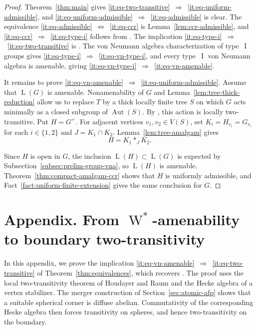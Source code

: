 \documentclass[11pt]{amsart}
\numberwithin{equation}{section}
\DeclareMathOperator{\LL}{L}
\DeclareMathOperator{\I}{I}
\DeclareMathOperator{\Aut}{Aut}
\newcommand{\Wstar}{\operatorname{W}^*}
\theoremstyle{definition}
\begin{document}
\begin{proof}
    Theorem~\ref{thm:main} gives \eqref{it:eq-two-transitive}~$\Rightarrow$~\eqref{it:eq-uniform-admissible}, and \eqref{it:eq-uniform-admissible}~$\Rightarrow$~\eqref{it:eq-admissible} is clear. The equivalence \eqref{it:eq-admissible}~$\Leftrightarrow$~\eqref{it:eq-ccr} is Lemma~\ref{lem:ccr-admissible}, and \eqref{it:eq-ccr}~$\Rightarrow$~\eqref{it:eq-type-i} follows from \cite{Ka51}. The implication \eqref{it:eq-type-i}~$\Rightarrow$~\eqref{it:eq-two-transitive} is \cite[Corollary~D]{CKM23}. The von Neumann algebra characterization of type~$\I$ groups gives \eqref{it:eq-type-i}~$\Rightarrow$~\eqref{it:eq-vn-type-i}, and every type~$\I$ von Neumann algebra is amenable, giving \eqref{it:eq-vn-type-i}~$\Rightarrow$~\eqref{it:eq-vn-amenable}.

    It remains to prove \eqref{it:eq-vn-amenable}~$\Rightarrow$~\eqref{it:eq-uniform-admissible}. Assume that $\LL(G)$ is amenable. Nonamenability of $G$ and Lemma~\ref{lem:tree-thick-reduction} allow us to replace $T$ by a thick locally finite tree $S$ on which $G$ acts minimally as a closed subgroup of $\Aut(S)$. By \cite[Theorem~C]{HR19}, this action is locally two-transitive. Put $H=G^+$. For adjacent vertices $v_1,v_2\in V(S)$, set $K_i=H_{v_i}=G_{v_i}$ for each $i\in\{1,2\}$ and $J=K_1\cap K_2$. Lemma~\ref{lem:tree-amalgam} gives
    $$
        H=K_1\ast_JK_2.
    $$

    Since $H$ is open in $G$, the inclusion $\LL(H)\subset\LL(G)$ is expected by Subsection~\ref{subsec:prelim-group-vna}, so $\LL(H)$ is amenable. Theorem~\ref{thm:compact-amalgam-ccr} shows that $H$ is uniformly admissible, and Fact~\ref{fact:uniform-finite-extension} gives the same conclusion for $G$.
\end{proof}



\appendix

\section*{Appendix. From \texorpdfstring{$\Wstar$}{W*}-amenability to boundary two-transitivity}
\label{sec:amenability-boundary}

In this appendix, we prove the implication \eqref{it:eq-vn-amenable}~$\Rightarrow$~\eqref{it:eq-two-transitive} of Theorem~\ref{thm:equivalences}, which recovers \cite[Corollary~D]{CKM23}. The proof uses the local two-transitivity theorem of Houdayer and Raum \cite[Theorem~C]{HR19} and the Hecke algebra of a vertex stabilizer. The merger construction of Section~\ref{sec:atomic-afp} shows that a suitable spherical corner is diffuse abelian. Commutativity of the corresponding Hecke algebra then forces transitivity on spheres, and hence two-transitivity on the boundary.
\end{document}
